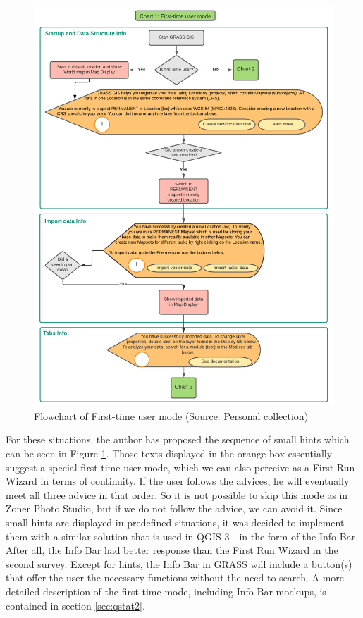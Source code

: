 \documentclass[a4paper,10pt,twoside]{article}
\begin{document}
\vspace{0.3cm}
\begin{figure}[hbt!] 
\begin{center}
\includegraphics[width=16cm]{../pictures/first-time_user_diagram.png} 
\caption[Flowchart of First-time user mode]{Flowchart of First-time user mode (Source: Personal collection)}
\label{fig:first-time_user_diagram}
\end{center}
\end{figure}

For these situations, the author has proposed the sequence of small
hints which can be seen in Figure
\ref{fig:first-time_user_diagram}. Those texts displayed in the orange
box essentially suggest a special first-time user mode, which we can
also perceive as a First Run Wizard in terms of continuity. If the
user follows the advices, he will eventually meet all three advice in
that order. So it is not possible to skip this mode as in Zoner Photo
Studio, but if we do not follow the advice, we can avoid it. Since
small hints are displayed in predefined situations, it was decided to
implement them with a similar solution that is used in QGIS 3 - in the
form of the Info Bar. After all, the Info Bar had better response than
the First Run Wizard in the second survey. Except for hints, the Info
Bar in GRASS will include a button(s) that offer the user the
necessary functions without the need to search. A more detailed
description of the first-time mode, including Info Bar mockups, is
contained in section \ref{sec:qstat2}.
\end{document}
